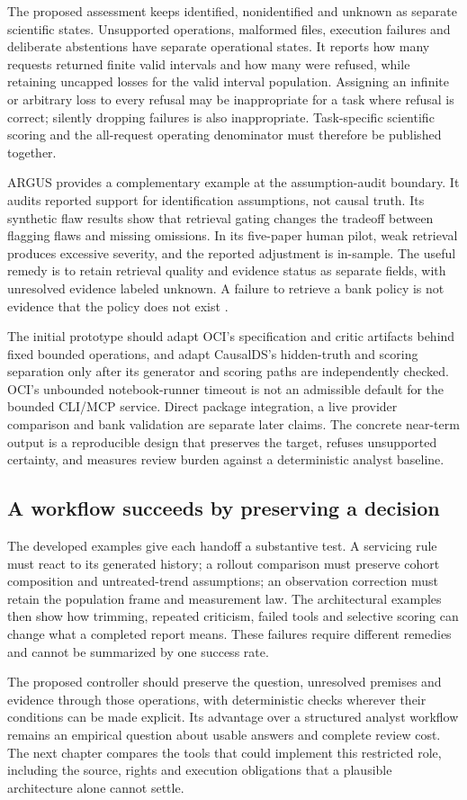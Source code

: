 The proposed assessment keeps identified, nonidentified and unknown as separate
scientific states. Unsupported operations, malformed files, execution failures
and deliberate abstentions have separate operational states. It reports how
many requests returned finite valid intervals and how many were refused, while
retaining uncapped losses for the valid interval population. Assigning an
infinite or arbitrary loss to every refusal may be inappropriate for a task
where refusal is correct; silently dropping failures is also inappropriate.
Task-specific scientific scoring and the all-request operating denominator
must therefore be published together.

ARGUS provides a complementary example at the assumption-audit boundary. It
audits reported support for identification assumptions, not causal truth. Its
synthetic flaw results show that retrieval gating changes the tradeoff between
flagging flaws and missing omissions. In its five-paper human pilot, weak
retrieval produces excessive severity, and the reported adjustment is in-sample.
The useful remedy is to retain retrieval quality and evidence status as separate
fields, with unresolved evidence labeled unknown. A failure to retrieve a bank
policy is not evidence that the policy does not exist
\citep{v12_la_2609_30867}.

The initial prototype should adapt OCI's specification and critic artifacts
behind fixed bounded operations, and adapt CausalDS's hidden-truth and scoring
separation only after its generator and scoring paths are independently checked.
OCI's unbounded notebook-runner timeout is not an admissible default for the
bounded CLI/MCP service. Direct package integration, a live provider comparison
and bank validation are separate later claims. The concrete near-term output is
a reproducible design that preserves the target, refuses unsupported certainty,
and measures review burden against a deterministic analyst baseline.
\subsection{A workflow succeeds by preserving a decision}

The developed examples give each handoff a substantive test. A servicing rule
must react to its generated history; a rollout comparison must preserve cohort
composition and untreated-trend assumptions; an observation correction must
retain the population frame and measurement law. The architectural examples
then show how trimming, repeated criticism, failed tools and selective scoring
can change what a completed report means. These failures require different
remedies and cannot be summarized by one success rate.

The proposed controller should preserve the question, unresolved premises and
evidence through those operations, with deterministic checks wherever their
conditions can be made explicit. Its advantage over a structured analyst
workflow remains an empirical question about usable answers and complete
review cost. The next chapter compares the tools that could implement this
restricted role, including the source, rights and execution obligations that
a plausible architecture alone cannot settle.
\label{exec14:estimation-validation-end}
